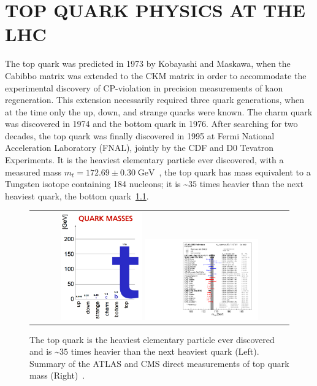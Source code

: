 
\chapter{TOP QUARK PHYSICS AT THE LHC}
\label{Top_Quark_Physics_at_the_LHC}
The top quark was predicted in 1973 by Kobayashi and Maskawa, when the Cabibbo matrix was extended to the CKM matrix in order to accommodate the experimental discovery of CP-violation in precision measurements of kaon regeneration.
This extension necessarily required three quark generations, when at the time only the up, down, and strange quarks were known.
The charm quark was discovered in 1974 and the bottom quark in 1976.
After searching for two decades, the top quark was finally discovered in 1995 at Fermi National Acceleration Laboratory (FNAL), jointly by the CDF and D0 Tevatron Experiments.
It is the heaviest elementary particle ever discovered, with a measured mass $m_t = 172.69 \pm 0.30 \; \si{\GeV}$~\cite{bib:PDG}, the top quark has mass equivalent to a Tungsten isotope containing 184 nucleons; it is \sim$35$ times heavier than the next heaviest quark, the bottom quark~\ref{QuarkMasses}.
\begin{figure}[htb]
  \begin{center}
    \begin{tabular}{c}
        \includegraphics[width=0.325\textwidth]{fig_TopQuark/TopQuarkMass.png}
        \includegraphics[width=0.45\textwidth]{fig_TopQuark/LHC_topmass_oct22.pdf}
    \end{tabular}
    \caption{The top quark is the heaviest elementary particle ever discovered and is \sim$35$ times heavier than the next heaviest quark (Left).
            Summary of the ATLAS and CMS direct measurements of top quark mass (Right)~\cite{LHCTopWGSummaryPlots}.
            }
    \label{QuarkMasses}
  \end{center}
\end{figure}
